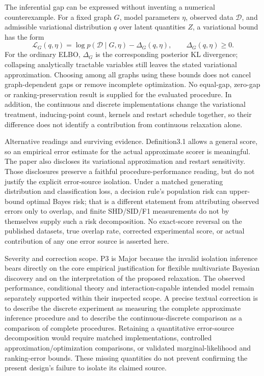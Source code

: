 \documentclass[10pt]{article}
\begin{document}
The inferential gap can be expressed without inventing a numerical counterexample. For a fixed graph \(G\), model parameters \(\eta\), observed data \(\mathcal D\), and admissible variational distribution \(q\) over latent quantities \(Z\), a variational bound has the form \[\mathcal L_G(q,\eta)
 =\log p(\mathcal D\mid G,\eta)-\Delta_G(q,\eta),
 \qquad \Delta_G(q,\eta)\geq0.\] For the ordinary ELBO, \(\Delta_G\) is the corresponding posterior KL divergence; collapsing analytically tractable variables still leaves the stated variational approximation. Choosing among all graphs using these bounds does not cancel graph-dependent gaps or remove incomplete optimization. No equal-gap, zero-gap or ranking-preservation result is supplied for the evaluated procedure. In addition, the continuous and discrete implementations change the variational treatment, inducing-point count, kernels and restart schedule together, so their difference does not identify a contribution from continuous relaxation alone.\par
Alternative readings and surviving evidence. Definition3.1 allows a general score, so an empirical error estimate for the actual approximate scorer is meaningful. The paper also discloses its variational approximation and restart sensitivity. Those disclosures preserve a faithful procedure-performance reading, but do not justify the explicit error-source isolation. Under a matched generating distribution and classification loss, a decision rule’s population risk can upper-bound optimal Bayes risk; that is a different statement from attributing observed errors only to overlap, and finite SHD/SID/F1 measurements do not by themselves supply such a risk decomposition. No exact-score reversal on the published datasets, true overlap rate, corrected experimental score, or actual contribution of any one error source is asserted here.\par
Severity and correction scope. P3 is Major because the invalid isolation inference bears directly on the core empirical justification for flexible multivariate Bayesian discovery and on the interpretation of the proposed relaxation. The observed performance, conditional theory and interaction-capable intended model remain separately supported within their inspected scope. A precise textual correction is to describe the discrete experiment as measuring the complete approximate inference procedure and to describe the continuous-discrete comparison as a comparison of complete procedures. Retaining a quantitative error-source decomposition would require matched implementations, controlled approximation/optimization comparisons, or validated marginal-likelihood and ranking-error bounds. These missing quantities do not prevent confirming the present design’s failure to isolate its claimed source.\par
\end{document}
